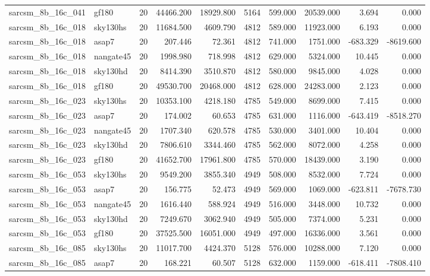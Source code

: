 \begin{tabular}{llrrrrrrrr}
sarcsm\_8b\_16c\_041 & gf180 & 20 & 44466.200 & 18929.800 & 5164 & 599.000 & 20539.000 & 3.694 & 0.000 \\
sarcsm\_8b\_16c\_018 & sky130hs & 20 & 11684.500 & 4609.790 & 4812 & 589.000 & 11923.000 & 6.193 & 0.000 \\
sarcsm\_8b\_16c\_018 & asap7 & 20 & 207.446 & 72.361 & 4812 & 741.000 & 1751.000 & -683.329 & -8619.600 \\
sarcsm\_8b\_16c\_018 & nangate45 & 20 & 1998.980 & 718.998 & 4812 & 629.000 & 5324.000 & 10.445 & 0.000 \\
sarcsm\_8b\_16c\_018 & sky130hd & 20 & 8414.390 & 3510.870 & 4812 & 580.000 & 9845.000 & 4.028 & 0.000 \\
sarcsm\_8b\_16c\_018 & gf180 & 20 & 49530.700 & 20468.000 & 4812 & 628.000 & 24283.000 & 2.123 & 0.000 \\
sarcsm\_8b\_16c\_023 & sky130hs & 20 & 10353.100 & 4218.180 & 4785 & 549.000 & 8699.000 & 7.415 & 0.000 \\
sarcsm\_8b\_16c\_023 & asap7 & 20 & 174.002 & 60.653 & 4785 & 631.000 & 1116.000 & -643.419 & -8518.270 \\
sarcsm\_8b\_16c\_023 & nangate45 & 20 & 1707.340 & 620.578 & 4785 & 530.000 & 3401.000 & 10.404 & 0.000 \\
sarcsm\_8b\_16c\_023 & sky130hd & 20 & 7806.610 & 3344.460 & 4785 & 562.000 & 8072.000 & 4.258 & 0.000 \\
sarcsm\_8b\_16c\_023 & gf180 & 20 & 41652.700 & 17961.800 & 4785 & 570.000 & 18439.000 & 3.190 & 0.000 \\
sarcsm\_8b\_16c\_053 & sky130hs & 20 & 9549.200 & 3855.340 & 4949 & 508.000 & 8532.000 & 7.724 & 0.000 \\
sarcsm\_8b\_16c\_053 & asap7 & 20 & 156.775 & 52.473 & 4949 & 569.000 & 1069.000 & -623.811 & -7678.730 \\
sarcsm\_8b\_16c\_053 & nangate45 & 20 & 1616.440 & 588.924 & 4949 & 516.000 & 3448.000 & 10.732 & 0.000 \\
sarcsm\_8b\_16c\_053 & sky130hd & 20 & 7249.670 & 3062.940 & 4949 & 505.000 & 7374.000 & 5.231 & 0.000 \\
sarcsm\_8b\_16c\_053 & gf180 & 20 & 37525.500 & 16051.000 & 4949 & 497.000 & 16336.000 & 3.561 & 0.000 \\
sarcsm\_8b\_16c\_085 & sky130hs & 20 & 11017.700 & 4424.370 & 5128 & 576.000 & 10288.000 & 7.120 & 0.000 \\
sarcsm\_8b\_16c\_085 & asap7 & 20 & 168.221 & 60.507 & 5128 & 632.000 & 1159.000 & -618.411 & -7808.410 \\

\end{tabular}
